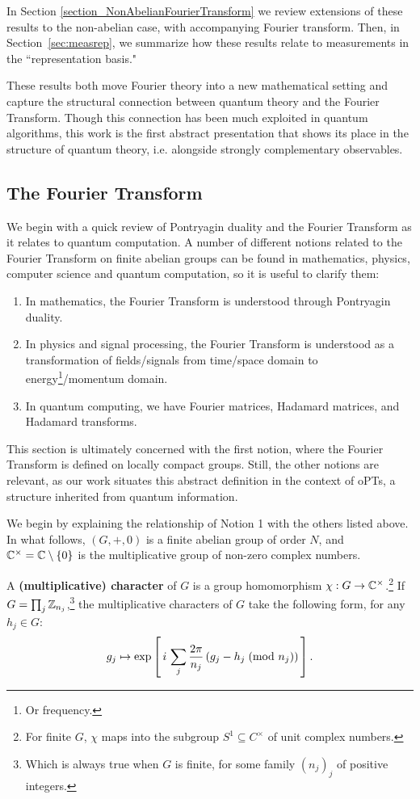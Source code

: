 In Section \ref{section_NonAbelianFourierTransform} we review extensions of these results to the non-abelian case, with accompanying Fourier transform. Then, in Section~\ref{sec:measrep}, we summarize how these results relate to measurements in the ``representation basis."

These results both move Fourier theory into a new mathematical setting and capture the structural connection between quantum theory and the Fourier Transform.  Though this connection has been much exploited in quantum algorithms, this work is the first abstract presentation that shows its place in the structure of quantum theory, i.e. alongside strongly complementary observables.
\subsection{The Fourier Transform}
\label{sec:FT}
We begin with a quick review of Pontryagin duality and the Fourier Transform as it relates to quantum computation. A number of different notions related to the Fourier Transform on finite abelian groups can be found in mathematics, physics, computer science and quantum computation, so it is useful to clarify them:

\begin{enumerate}
  \item[1.] In mathematics, the Fourier Transform is understood through Pontryagin duality.
  \item[2.] In physics and signal processing, the Fourier Transform is understood as a transformation of fields/signals from time/space domain to energy\footnote{Or frequency.}/momentum domain.
  \item[3.] In quantum computing, we have Fourier matrices, Hadamard matrices, and Hadamard transforms.
\end{enumerate}

This section is ultimately concerned with the first notion, where the Fourier Transform is defined on locally compact groups. Still, the other notions are relevant, as our work situates this abstract definition in the context of oPTs, a structure inherited from quantum information. 

We begin by explaining the relationship of Notion 1 with the others listed above. In what follows, $(G,+,0)$ is a finite abelian group of order $N$, and $\mathbb{C}^{\times}=\mathbb{C}\setminus\{0\}$ is the multiplicative group of non-zero complex numbers.

A \textbf{(multiplicative) character} of $G$ is a group homomorphism $\chi:G\to \mathbb{C}^\times$.\footnote{For finite $G$, $\chi$ maps into the subgroup $S^1 \subseteq C^\times$ of unit complex numbers.} If $G = \prod_j \mathbb{Z}_{n_j}$,\footnote{Which is always true when $G$ is finite, for some family $(n_j)_j$ of positive integers.} the multiplicative characters of $G$ take the following form, for any $h_j \in G$:
\begin{equation}
\label{eqn:FTDefCharacters}
  g_j \mapsto \exp\left[\, i \, \sum_j \frac{2 \pi}{n_j} \left(g_j-h_j \; (\text{mod } n_j)\right) \, \right].
\end{equation}

